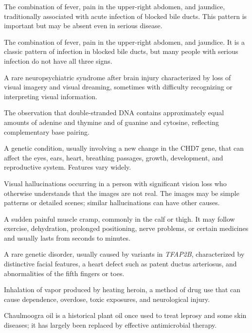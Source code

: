  The combination of fever, pain in the upper-right abdomen, and jaundice, traditionally associated with acute infection of blocked bile ducts. This pattern is important but may be absent even in serious disease.

 The combination of fever, pain in the upper-right abdomen, and jaundice. It is a classic pattern of infection in blocked bile ducts, but many people with serious infection do not have all three signs.

 A rare neuropsychiatric syndrome after brain injury characterized by loss of visual imagery and visual dreaming, sometimes with difficulty recognizing or interpreting visual information.

 The observation that double-stranded DNA contains approximately equal amounts of adenine and thymine and of guanine and cytosine, reflecting complementary base pairing.

 A genetic condition, usually involving a new change in the CHD7 gene, that can affect the eyes, ears, heart, breathing passages, growth, development, and reproductive system. Features vary widely.

 Visual hallucinations occurring in a person with significant vision loss who otherwise understands that the images are not real. The images may be simple patterns or detailed scenes; similar hallucinations can have other causes.

 A sudden painful muscle cramp, commonly in the calf or thigh. It may follow exercise, dehydration, prolonged positioning, nerve problems, or certain medicines and usually lasts from seconds to minutes.

 A rare genetic disorder, usually caused by variants in \textit{TFAP2B}, characterized by distinctive facial features, a heart defect such as patent ductus arteriosus, and abnormalities of the fifth fingers or toes.

 Inhalation of vapor produced by heating heroin, a method of drug use that can cause dependence, overdose, toxic exposures, and neurological injury.

 Chaulmoogra oil is a historical plant oil once used to treat leprosy and some skin diseases; it has largely been replaced by effective antimicrobial therapy.

